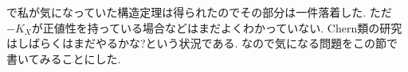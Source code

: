 \documentclass[dvipdfmx]{msjproc}
\theoremstyle{definition}
\newcommand{\C}{\mathbb{C}}
\begin{document}
\begin{comment}

{\footnotesize
\[
\begin{array}{|c|c|c|c|c|c|}
\hline
& \text{$K_X$ 豊富} & \text{$K_X$曲率0} & \text{$K_X$ネフ}  & 
\begin{tabular}{c}
\text{$-K_X$豊富で}\\
\text{一様K安定} 
\end{tabular}
& \text{$-K_X$ネフ}\\
\hline
\begin{tabular}{c}
\text{不等式} 
\end{tabular}
& c_2 - \frac{n}{2(n+1)}c_{1}^2 \geq 0 & c_2 \geq 0 & c_2 - \frac{1}{3}c_{1}^2 \geq 0 
& c_2- \frac{n}{2(n+1)}c_{1}^2 \geq 0 & c_{2} \geq 0  \\
\hline
\text{構造定理} 
& 
\begin{tabular}{c}
\text{普遍被覆が}\\
\text{$\C^n$の単位球} 
\end{tabular}
&
トーラス
 & 
 { \tiny
 \begin{tabular}{l}
\text{(1)トーラス}\\
\text{(2)種数2以上のリーマン面}\\
\text{のトーラスファイブレーション} \\
\text{(3)トーラスと普遍被覆が}\\
\text{$\C^2$の単位球となる曲面の直積} 
\end{tabular}
}
 & \C\mathbb{P}^n
 &
  \begin{tabular}{l}
\text{(1)トーラス}\\
\text{(2)トーラス上の}\\
\text{$\C\mathbb{P}^1$束} \\
\end{tabular}

 \\
\hline
\end{array}
\]
\end{comment}

\cite{IMM24}で私が気になっていた構造定理は得られたのでその部分は一件落着した. 
ただ$-K_X$が正値性を持っている場合などはまだよくわかっていない.
Chern類の研究はしばらくはまだやるかな?という状況である.
なので気になる問題をこの節で書いてみることにした.
\end{document}
